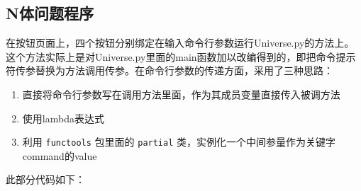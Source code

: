 \documentclass[]{report}
\begin{document}
		\subsection{N体问题程序}
		在按钮页面上，四个按钮分别绑定在输入命令行参数运行Universe.py的方法上。这个方法实际上是对Universe.py里面的main函数加以改编得到的，即把命令提示符传参替换为方法调用传参。在命令行参数的传递方面，采用了三种思路：
		\begin{enumerate}
			\item 直接将命令行参数写在调用方法里面，作为其成员变量直接传入被调方法
			\item 使用lambda表达式
			\item 利用 \verb|functools| 包里面的 \verb|partial| 类，实例化一个中间参量作为关键字command的value
		\end{enumerate}\par
		此部分代码如下：
\end{document}
